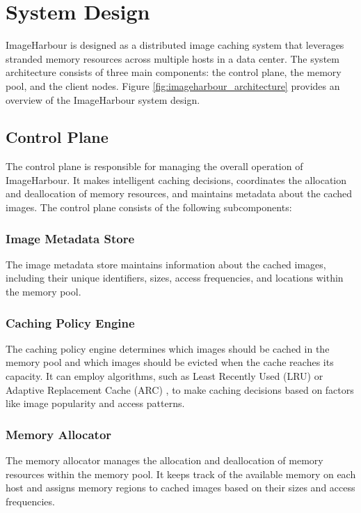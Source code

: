 \section{System Design}
ImageHarbour is designed as a distributed image caching system that leverages stranded memory resources across multiple hosts in a data center. The system architecture consists of three main components: the control plane, the memory pool, and the client nodes. Figure \ref{fig:imageharbour_architecture} provides an overview of the ImageHarbour system design.

\subsection{Control Plane}
The control plane is responsible for managing the overall operation of ImageHarbour. It makes intelligent caching decisions, coordinates the allocation and deallocation of memory resources, and maintains metadata about the cached images. The control plane consists of the following subcomponents:

\subsubsection{Image Metadata Store}
The image metadata store maintains information about the cached images, including their unique identifiers, sizes, access frequencies, and locations within the memory pool.

\subsubsection{Caching Policy Engine}
The caching policy engine determines which images should be cached in the memory pool and which images should be evicted when the cache reaches its capacity. It can employ algorithms, such as Least Recently Used (LRU) or Adaptive Replacement Cache (ARC) \cite{megiddo2003arc}, to make caching decisions based on factors like image popularity and access patterns.

\subsubsection{Memory Allocator}
The memory allocator manages the allocation and deallocation of memory resources within the memory pool. It keeps track of the available memory on each host and assigns memory regions to cached images based on their sizes and access frequencies.

